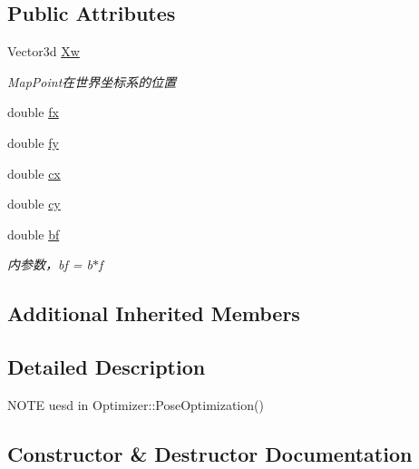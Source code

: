 \subsection*{Public Attributes}
\begin{DoxyCompactItemize}
\item 
Vector3d \mbox{\hyperlink{classg2o_1_1_edge_stereo_s_e3_project_x_y_z_only_pose_aa7c861f93edd02d3ef763c0e706cf496}{Xw}}
\begin{DoxyCompactList}\small\item\em Map\+Point在世界坐标系的位置 \end{DoxyCompactList}\item 
double \mbox{\hyperlink{classg2o_1_1_edge_stereo_s_e3_project_x_y_z_only_pose_aebf839be304521edf2f3cb445b3bf618}{fx}}
\item 
double \mbox{\hyperlink{classg2o_1_1_edge_stereo_s_e3_project_x_y_z_only_pose_a7f779153148f1eb403ab6f2984b47eec}{fy}}
\item 
double \mbox{\hyperlink{classg2o_1_1_edge_stereo_s_e3_project_x_y_z_only_pose_a7b0f52c3f2931706838373ca7d4513a7}{cx}}
\item 
double \mbox{\hyperlink{classg2o_1_1_edge_stereo_s_e3_project_x_y_z_only_pose_a95e79aa1ef43455cd6de7ccced2fc1e8}{cy}}
\item 
double \mbox{\hyperlink{classg2o_1_1_edge_stereo_s_e3_project_x_y_z_only_pose_a831d3e73bf61102622a7ac6af0475e7b}{bf}}
\begin{DoxyCompactList}\small\item\em 内参数，bf = b$\ast$f \end{DoxyCompactList}\end{DoxyCompactItemize}
\subsection*{Additional Inherited Members}


\subsection{Detailed Description}
N\+O\+TE uesd in Optimizer\+::\+Pose\+Optimization() 

\subsection{Constructor \& Destructor Documentation}
\mbox{\label{classg2o_1_1_edge_stereo_s_e3_project_x_y_z_only_pose_a083a4f79a0ac5ff0deab0c9e8e9c9907}} 
